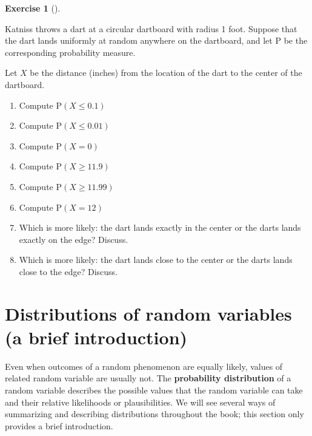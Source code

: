 \documentclass[
  letterpaper,
  DIV=11,
  numbers=noendperiod]{scrreprt}
\providecommand{\tightlist}{%
  \setlength{\itemsep}{0pt}\setlength{\parskip}{0pt}}
\theoremstyle{plain}
\theoremstyle{definition}
\theoremstyle{definition}
\newtheorem{exercise}{Exercise}[chapter]
\theoremstyle{definition}
\theoremstyle{remark}
\begin{document}
\begin{exercise}[]\protect\hypertarget{exr-probspace-dartboard-c}{}\label{exr-probspace-dartboard-c}

Katniss throws a dart at a circular dartboard with radius 1 foot.
Suppose that the dart lands uniformly at random anywhere on the
dartboard, and let \(\textrm{P}\) be the corresponding probability
measure.

Let \(X\) be the distance (inches) from the location of the dart to the
center of the dartboard.

\begin{enumerate}
\def\labelenumi{\arabic{enumi}.}
\tightlist
\item
  Compute \(\textrm{P}(X \le 0.1)\)
\item
  Compute \(\textrm{P}(X \le 0.01)\)
\item
  Compute \(\textrm{P}(X = 0)\)
\item
  Compute \(\textrm{P}(X \ge 11.9)\)
\item
  Compute \(\textrm{P}(X \ge 11.99)\)
\item
  Compute \(\textrm{P}(X = 12)\)
\item
  Which is more likely: the dart lands exactly in the center or the
  darts lands exactly on the edge? Discuss.
\item
  Which is more likely: the dart lands close to the center or the darts
  lands close to the edge? Discuss.
\end{enumerate}

\end{exercise}

\section{Distributions of random variables (a brief
introduction)}\label{sec-dist-intro}

Even when outcomes of a random phenomenon are equally likely, values of
related random variable are usually not. The \textbf{probability
distribution} of a random variable describes the possible values that
the random variable can take and their relative likelihoods or
plausibilities. We will see several ways of summarizing and describing
distributions throughout the book; this section only provides a brief
introduction.
\end{document}
